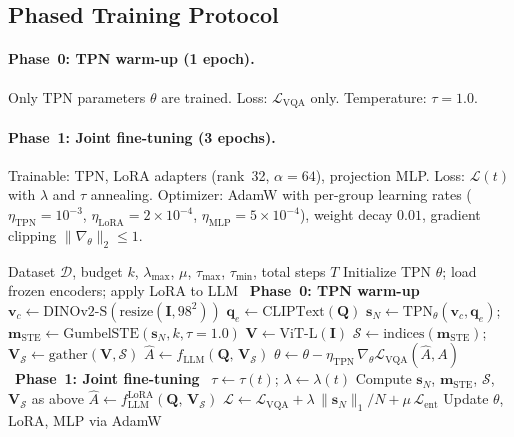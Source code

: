 \documentclass[11pt,a4paper]{article}
\newcommand{\vc}{\mathbf{v}_c}
\newcommand{\qe}{\mathbf{q}_e}
\newcommand{\vm}{\mathbf{m}}
\newcommand{\vs}{\mathbf{s}}
\newcommand{\mI}{\mathbf{I}}
\newcommand{\mQ}{\mathbf{Q}}
\newcommand{\mV}{\mathbf{V}}
\begin{document}
\subsection{Phased Training Protocol}

\paragraph{Phase~0: TPN warm-up (1 epoch).}
Only TPN parameters $\theta$ are trained.
Loss: $\mathcal{L}_{\mathrm{VQA}}$ only.
Temperature: $\tau{=}1.0$.

\paragraph{Phase~1: Joint fine-tuning (3 epochs).}
Trainable: TPN, LoRA adapters (rank~32, $\alpha{=}64$), projection MLP.
Loss: $\mathcal{L}(t)$ with $\lambda$ and $\tau$ annealing.
Optimizer: AdamW with per-group learning rates
($\eta_{\mathrm{TPN}}{=}10^{-3}$,
$\eta_{\mathrm{LoRA}}{=}2{\times}10^{-4}$,
$\eta_{\mathrm{MLP}}{=}5{\times}10^{-4}$),
weight decay $0.01$, gradient clipping $\lVert\nabla_\theta\rVert_2 \leq 1$.

\begin{algorithm}[t]
\caption{TC-ViTok Training}
\label{alg:training}
\begin{algorithmic}[1]
\Require Dataset $\mathcal{D}$, budget $k$, $\lambda_{\max}$, $\mu$,
  $\tau_{\max}$, $\tau_{\min}$, total steps $T$
\State Initialize TPN $\theta$; load frozen encoders; apply LoRA to LLM
\Statex \hrulefill\ \textbf{Phase~0: TPN warm-up}\ \hrulefill
{}
  \State $\vc \gets \mathrm{DINOv2\text{-}S}(\mathrm{resize}(\mI, 98^2))$
  \State $\qe \gets \mathrm{CLIPText}(\mQ)$
  \State $\vs_N \gets \mathrm{TPN}_\theta(\vc, \qe)$;\;
    $\vm_{\mathrm{STE}} \gets \mathrm{GumbelSTE}(\vs_N, k, \tau{=}1.0)$
  \State $\mV \gets \mathrm{ViT\text{-}L}(\mI)$
  \State $\mathcal{S} \gets \mathrm{indices}(\vm_{\mathrm{STE}})$;\;
    $\mV_\mathcal{S} \gets \mathrm{gather}(\mV, \mathcal{S})$
  \State $\hat{A} \gets f_{\mathrm{LLM}}(\mQ,\, \mV_\mathcal{S})$
  \State $\theta \gets \theta - \eta_{\mathrm{TPN}}\,
    \nabla_\theta \mathcal{L}_{\mathrm{VQA}}(\hat{A}, A)$
\EndFor
\Statex \hrulefill\ \textbf{Phase~1: Joint fine-tuning}\ \hrulefill
{}
  \State $\tau \gets \tau(t)$;\; $\lambda \gets \lambda(t)$
  \State Compute $\vs_N$, $\vm_{\mathrm{STE}}$, $\mathcal{S}$,
    $\mV_\mathcal{S}$ as above
  \State $\hat{A} \gets f_{\mathrm{LLM}}^{\mathrm{LoRA}}(\mQ,\, \mV_\mathcal{S})$
  \State $\mathcal{L} \gets \mathcal{L}_{\mathrm{VQA}}
    + \lambda\,\lVert\vs_N\rVert_1/N
    + \mu\,\mathcal{L}_{\mathrm{ent}}$
  \State Update $\theta$, LoRA, MLP via AdamW
\EndFor
\end{algorithmic}
\end{algorithm}
\end{document}
